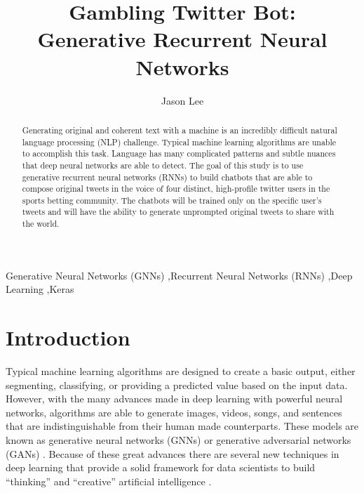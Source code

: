 \documentclass[5p,authoryear]{elsarticle}
\begin{document}
\begin{frontmatter}

\title{Gambling Twitter Bot: \\Generative Recurrent Neural Networks}
\author{Jason Lee}
\address{Northwestern University, SPS \\Artificial Intelligence and Deep Learning \\2019FA MSDS 458-56}


\begin{abstract}

Generating original and coherent text with a machine is an incredibly difficult natural language processing (NLP) challenge. Typical machine learning algorithms are unable to accomplish this task. Language has many complicated patterns and subtle nuances that deep neural networks are able to detect. The goal of this study is to use generative recurrent neural networks (RNNs) to build chatbots that are able to compose original tweets in the voice of four distinct, high-profile twitter users in the sports betting community. The chatbots will be trained only on the specific user’s tweets and will have the ability to generate unprompted original tweets to share with the world.

\end{abstract}



\begin{keyword}
Generative Neural Networks (GNNs) \sep Recurrent Neural Networks (RNNs) \sep Deep Learning \sep Keras\end{keyword}

\end{frontmatter}



\section{Introduction}\label{introduction}

Typical machine learning algorithms are designed to create a basic output, either segmenting, classifying, or providing a predicted value based on the input data. However, with the many advances made in deep learning with powerful neural networks, algorithms are able to generate images, videos, songs, and sentences that are indistinguishable from their human made counterparts. These models are known as generative neural networks (GNNs) or generative adversarial networks (GANs) \citep{chollet}. Because of these great advances there are several new techniques in deep learning that provide a solid framework for data scientists to build “thinking” and “creative” artificial intelligence \citep{foster}. 
\end{document}
